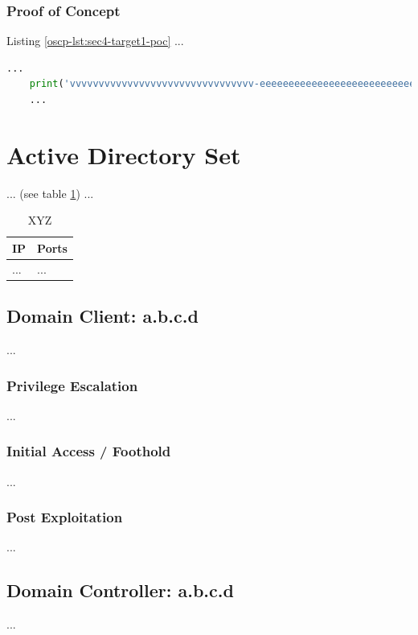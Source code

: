 \subsubsection{Proof of Concept}\label{oscp-sec:sec4-target1-poc}
%
Listing \ref{oscp-lst:sec4-target1-poc} ...\\

\begin{lstlisting}[language=Python,caption={Proof of Concept}, label={oscp-lst:sec4-target1-poc}]
    ...
    print('vvvvvvvvvvvvvvvvvvvvvvvvvvvvvvvv-eeeeeeeeeeeeeeeeeeeeeeeeeeeeeeeeeeeeeeeeeee-looooooooooooooooooooooong-striiiiiiiiiiiiiing')
    ...
\end{lstlisting}
%
%
%
\section{Active Directory Set}\label{oscp-sec:sec5}
%
... (see table \ref{oscp-tbl:sec5-xyz}) ...

\begin{table}[H]
    \begin{tabularx}{\textwidth}{l|l}
        \textbf{IP} & \textbf{Ports} \\
        \hline
        ... & ...\\
    \end{tabularx}
    \caption{XYZ\label{oscp-tbl:sec5-xyz}}
\end{table}
%
%
%
\subsection{Domain Client: a.b.c.d}\label{oscp-sec:sec5-client1}
%
...
%
%
%
\subsubsection{Privilege Escalation}\label{oscp-sec:sec5-client1-priv}
%
...
%
%
%
\subsubsection{Initial Access / Foothold}\label{oscp-sec:sec5-client1-init}
%
...
%
%
%
\subsubsection{Post Exploitation}\label{oscp-sec:sec5-client1-post}
%
...
%
%
%
\subsection{Domain Controller: a.b.c.d}\label{oscp-sec:sec5-dc1}
%
...
%
%
%
